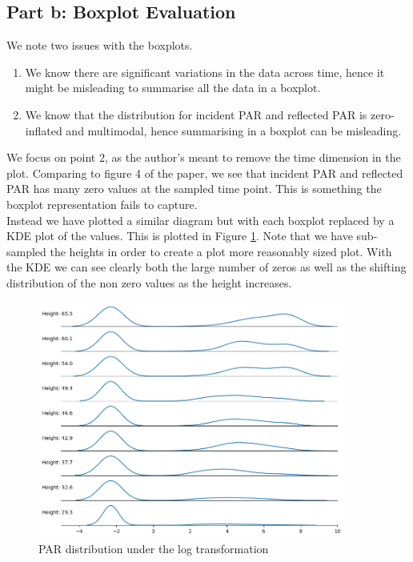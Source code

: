 \documentclass[11pt, letterpaper]{article}
\begin{document}
\subsection{Part b: Boxplot Evaluation}
We note two issues with the boxplots.
\begin{enumerate}
    \item We know there are significant variations in the data across time, hence it might be misleading to summarise all the data in a boxplot.
    \item We know that the distribution for incident PAR and reflected PAR is zero-inflated and multimodal, hence summarising in a boxplot can be misleading.
\end{enumerate}
We focus on point 2, as the author's meant to remove the time dimension in the plot. Comparing to figure 4 of the paper, we see that incident PAR and reflected PAR has many zero values at the sampled time point. This is something the boxplot representation fails to capture. \\
Instead we have plotted a similar diagram but with each boxplot replaced by a KDE plot of the values. This is plotted in Figure \ref{fig:graph_crtique_b}. Note that we have sub-sampled the heights in order to create a plot more reasonably sized plot. With the KDE we can see clearly both the large number of zeros as well as the shifting distribution of the non zero values as the height increases.
\begin{figure}[h!]
\centering
\captionsetup{justification=centering}
\includegraphics[width=0.9\textwidth]{Report Images/Fig7_graph_criqitue_bv2.png}
\caption{PAR distribution under the log transformation}
\label{fig:graph_crtique_b}
\end{figure}
\\
\end{document}
